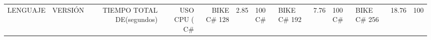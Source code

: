 \begin{tabular}{llrrr}
\toprule
LENGUAJE &     VERSIÓN & TIEMPO TOTAL DE (segundos) & USO CPU (%
\midrule
      C# & BIKE C# 128 &                                  2.85 &        100%
      C# & BIKE C# 192 &                                  7.76 &        100%
      C# & BIKE C# 256 &                                 18.76 &        100%
\bottomrule
\end{tabular}
